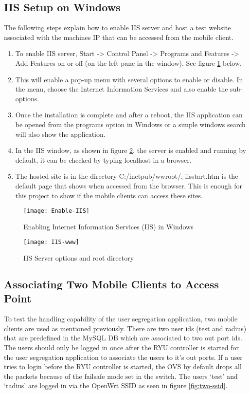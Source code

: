 \subsection{IIS Setup on Windows}
The following steps explain how to enable IIS server and host a test website associated with the machines IP that can be accessed from the mobile client.

\begin{enumerate}
	\item To enable IIS server, Start -> Control Panel -> Programs and Features -> Add Features on or off (on the left pane in the window). See figure \ref{fig:enable_iis} below.
	\item This will enable a pop-up menu with several options to enable or disable. In the menu, choose the Internet Information Services and also enable the sub-options.
	\item Once the installation is complete and after a reboot, the IIS application can be opened from the programs option in Windows or a simple windows search will also show the application.
	\item In the IIS window, as shown in figure \ref{fig:iis-www}, the server is enabled and running by default, it can be checked by typing localhost in a browser.
	\item The hosted site is in the directory C:/inetpub/wwroot/, iisstart.htm is the default page that shows when accessed from the browser. This is enough for this project to show if the mobile clients can access these sites.
	
\end{enumerate}
  \begin{figure}
	\centering
	\texttt{[image: Enable-IIS]}
	\caption {Enabling Internet Information Services (IIS) in Windows}
	\label{fig:enable_iis}
	\vspace{-10pt}
  \end{figure}
  \begin{figure}
	\centering
	\texttt{[image: IIS-www]}
	\caption {IIS Server options and root directory}
	\label{fig:iis-www}
	\vspace{-10pt}
  \end{figure}
\subsection{Associating Two Mobile Clients to Access Point}
To test the handling capability of the user segregation application, two mobile clients are used as mentioned previously. There are two user ids (test and radius) that are predefined in the MySQL \gls{DB} which are associated to two out port ids. The users should only be logged in once after the RYU controller is started for the user segregation application to associate the users to it's out ports. If a user tries to login before the RYU controller is started, the OVS by default drops all the packets because of the failsafe mode set in the switch. The users ‘test’ and ‘radius’ are logged in via the OpenWrt SSID as seen in figure \ref{fig:two-ssid}.
